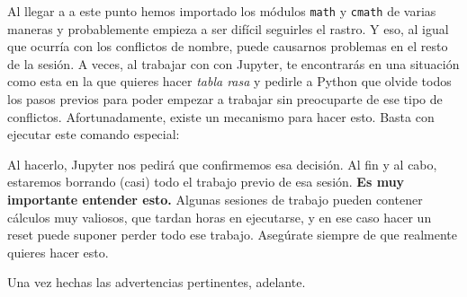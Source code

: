 \documentclass[10pt,a4paper]{article}\usepackage[]{graphicx}\usepackage[]{color}
\makeatletter
\newenvironment{kframe}{%
 \def\at@end@of@kframe{}%
 \ifinner\ifhmode%
  \def\at@end@of@kframe{\end{minipage}}%
  \begin{minipage}{\columnwidth}%
 \fi\fi%
 \def\FrameCommand##1{\hskip\@totalleftmargin \hskip-\fboxsep
 \colorbox{shadecolor}{##1}\hskip-\fboxsep
     \hskip-\linewidth \hskip-\@totalleftmargin \hskip\columnwidth}%
 \MakeFramed {\advance\hsize-\width
   \@totalleftmargin\z@ \linewidth\hsize
   \@setminipage}}%
 {\par\unskip\endMakeFramed%
 \at@end@of@kframe}
\newenvironment{knitrout}{}{} %
\newcounter {cont01}
\makeatother
\begin{document}
Al llegar a a este punto hemos importado los módulos {\tt math} y {\tt cmath} de varias maneras y probablemente empieza a ser difícil seguirles el rastro. Y eso, al igual que ocurría con los conflictos de nombre, puede causarnos problemas en el resto de la sesión. A veces, al trabajar con con Jupyter, te encontrarás en una situación como esta en la que quieres hacer {\em tabla rasa} y pedirle a Python que olvide todos los pasos previos para poder empezar a trabajar sin preocuparte de ese tipo de conflictos. Afortunadamente, existe un mecanismo para hacer esto. Basta con ejecutar este comando especial:
\begin{knitrout}
\color{fgcolor}\begin{kframe}
\begin{alltt}
\end{alltt}
\end{kframe}
\end{knitrout}
Al hacerlo, Jupyter nos pedirá que confirmemos esa decisión. Al fin y al cabo, estaremos borrando (casi) todo el trabajo previo de esa sesión. {\bf Es muy importante entender esto.} Algunas sesiones de trabajo pueden contener cálculos muy valiosos, que tardan horas en ejecutarse, y en ese caso hacer un reset puede suponer perder todo ese trabajo. Asegúrate siempre de que realmente quieres hacer esto.

Una vez hechas las advertencias pertinentes, adelante.
\end{document}
